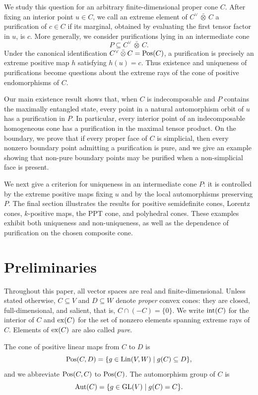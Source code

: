 \documentclass[11pt]{article}
\newcommand{\barabove}[1]{\hspace{2pt}\bar{#1}\hspace{2pt}}
\theoremstyle{result}
\theoremstyle{discussion}
\newcommand{\omax}{\barabove{\otimes}}
\begin{document}
We study this question for an arbitrary finite-dimensional proper cone
$C$.  After fixing an interior point $u\in C$, we call an extreme element of
$C^\vee\omax C$ a purification of $c\in C$ if its marginal, obtained by evaluating the first tensor factor in $u$, is $c$.  More
generally, we consider purifications lying in an intermediate cone
\[
    P\subseteq C^\vee\omax C.
\]
Under the canonical identification
$C^\vee\omax C={\rm Pos}(C)$, a purification is precisely an extreme
positive map $h$ satisfying $h(u)=c$.  Thus existence and uniqueness of
purifications become questions about the extreme rays of the cone of
positive endomorphisms of $C$.

Our main existence result shows that, when $C$ is indecomposable and $P$
contains the maximally entangled state, every point in a natural
automorphism orbit of $u$ has a purification in $P$.  In particular, every
interior point of an indecomposable homogeneous cone has a purification in
the maximal tensor product. On the
boundary, we prove that if every proper face of $C$ is simplicial, then every
nonzero boundary point admitting a purification is pure, and we give an
example showing that non-pure boundary points may be purified when a
non-simplicial face is present.

We next give a criterion for uniqueness in an intermediate cone $P$: it is
controlled by the extreme positive maps fixing $u$ and by the local
automorphisms preserving $P$.  The final section illustrates the results for
positive semidefinite cones, Lorentz cones, $k$-positive maps, the PPT cone,
and polyhedral cones.  These examples exhibit both uniqueness and
non-uniqueness, as well as the dependence of purification on the chosen
composite cone.

\section{Preliminaries}

Throughout this paper, all vector spaces are real and finite-dimensional.
Unless stated otherwise, $C\subseteq V$ and $D\subseteq W$ denote
\emph{proper} convex cones: they are closed, full-dimensional, and salient,
that is, $C\cap(-C)=\{0\}$. We write ${\rm int}(C)$ for the interior of
$C$ and ${\rm ex}(C)$ for the set of nonzero elements spanning extreme rays
of $C$. Elements of ${\rm ex}(C)$ are also called \emph{pure}.

The cone of positive linear maps from $C$ to $D$ is
\[
    {\rm Pos}(C,D)
    =\{g\in{\rm Lin}(V,W)\mid g(C)\subseteq D\},
\]
and we abbreviate ${\rm Pos}(C,C)$ to ${\rm Pos}(C)$. The automorphism group
of $C$ is
\[
    {\rm Aut}(C)
    =\{g\in{\rm GL}(V)\mid g(C)=C\}.
\]
\end{document}
